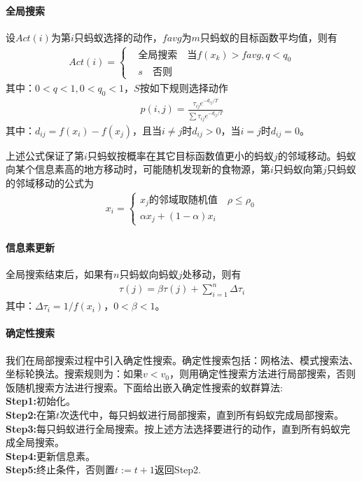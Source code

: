             \paragraph{全局搜索}设$Act(i)$为第$i$只蚂蚁选择的动作，$favg$为$m$只蚂蚁的目标函数平均值，则有
            \begin{align*}
            Act(i) = \left\{
            \begin{aligned}
            & \text{全局搜索}\quad \text{当}f(x_k)>favg,q<q_0\\
            & s\quad \text{否则}
            \end{aligned}
            \right.
            \end{align*}
            其中：$0<q<1,0<q_0<1$，$S$按如下规则选择动作
            \begin{align*}
            p(i,j) = \frac{\tau_{ij}e^{-d_{ij}/T}}{\sum \tau_{ij}e^{-d_{ij}/T}}
            \end{align*}
            其中：$d_{ij} = f(x_i)-f(x_j)$，且当$i\neq j$时$d_{ij}>0$，当$i = j$时$d_{ij} = 0$。
            \par
            上述公式保证了第$i$只蚂蚁按概率在其它目标函数值更小的蚂蚁$j$的邻域移动。蚂蚁向某个信息素高的地方移动时，可能随机发现新的食物源，第$i$只蚂蚁向第$j$只蚂蚁的邻域移动的公式为
            \begin{align*}
            x_i = \left\{
            \begin{aligned}
            x_j\text{的邻域取随机值} \quad \rho \leqslant \rho_0\\
            \alpha x_j +(1-\alpha)x_i
            \end{aligned}
            \right.
            \end{align*}
            \paragraph{信息素更新}全局搜索结束后，如果有$n$只蚂蚁向蚂蚁$j$处移动，则有
            \begin{align*}
            \tau(j) = \beta\tau(j)+\sum_{i=1}^n \Delta\tau_i
            \end{align*}
            其中：$\Delta\tau_i = 1/f(x_i)$，$0<\beta<1$。
            \paragraph{确定性搜索}我们在局部搜索过程中引入确定性搜索。确定性搜索包括：网格法、模式搜索法、坐标轮换法。搜索规则为：如果$v <v_0$，则用确定性搜索方法进行局部搜索，否则饭随机搜索方法进行搜索。下面给出嵌入确定性搜索的蚁群算法:\\
            \textbf{Step1:}初始化。\\
            \textbf{Step2:}在第$t$次迭代中，每只蚂蚁进行局部搜索，直到所有蚂蚁完成局部搜索。\\
            \textbf{Step3:}每只蚂蚁进行全局搜索。按上述方法选择要进行的动作，直到所有蚂蚁完成全局搜索。\\
            \textbf{Step4:}更新信息素。\\
            \textbf{Step5:}终止条件，否则置$t:=t+1$返回Step2.

